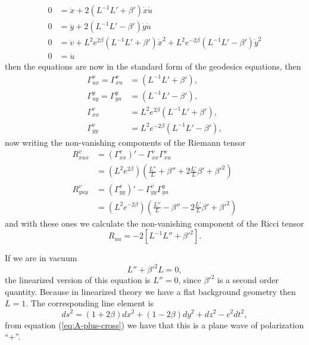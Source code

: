 \begin{align*}
0 & =\ddot{x}+2\left(L^{-1}L'+\beta'\right)\dot{x}\dot{u}\\
0 & =\ddot{y}+2\left(L^{-1}L'-\beta'\right)\dot{y}\dot{u}\\
0 & =\ddot{v}+L^{2}e^{2\beta}\left(L^{-1}L'+\beta'\right)\dot{x}^{2}+L^{2}e^{-2\beta}\left(L^{-1}L'-\beta'\right)\dot{y}^{2}\\
0 & =\ddot{u}
\end{align*}
then the equations are now in the standard form of the geodesics equations,
then
\begin{align*}
\Gamma_{ux}^{x}=\Gamma_{xu}^{x} & =\left(L^{-1}L'+\beta'\right),\\
\Gamma_{uy}^{y}=\Gamma_{yu}^{y} & =\left(L^{-1}L'-\beta'\right),\\
\Gamma_{xx}^{v} & =L^{2}e^{2\beta}\left(L^{-1}L'+\beta'\right),\\
\Gamma_{yy}^{v} & =L^{2}e^{-2\beta}\left(L^{-1}L'-\beta'\right),
\end{align*}
now writing the non-vanishing components of the Riemann tensor 
\begin{align}
R_{xux}^{v} & =\left(\Gamma_{xx}^{v}\right)'-\Gamma_{xx}^{v}\Gamma_{xu}^{x}\nonumber \\
\  & =\left(L^{2}e^{2\beta}\right)\left(\frac{L''}{L}+\beta''+2\frac{L'}{L}\beta'+{\beta'}^{2}\right)\label{eq:rvxux}\\
R_{yuy}^{v} & =\left(\Gamma_{yy}^{v}\right)'-\Gamma_{yy}^{v}\Gamma_{yu}^{y}\nonumber \\
\  & =\left(L^{2}e^{-2\beta}\right)\left(\frac{L''}{L}-\beta''-2\frac{L'}{L}\beta'+{\beta'}^{2}\right)\label{eq:rvyuy}
\end{align}
and with these ones we calculate the non-vanishing component of the
Ricci tensor
\[
R_{uu}=-2\left[L^{-1}L''+{\beta'}^{2}\right].
\]

If we are in vacuum
\begin{equation}
L''+{\beta'}^{2}L=0,\label{eq:LL}
\end{equation}
the linearized version of this equation is $L''=0$, since ${\beta'}^{2}$
is a second order quantity. Because in linearized theory we have a
flat background geometry then $L=1$. The corresponding line element
is
\[
ds^{2}=\left(1+2\beta\right)dx^{2}+\left(1-2\beta\right)dy^{2}+dz^{2}-c^{2}dt^{2},
\]
from equation (\ref{eq:A-plus-cross}) we have that this is a plane
wave of polarization ``+''.

